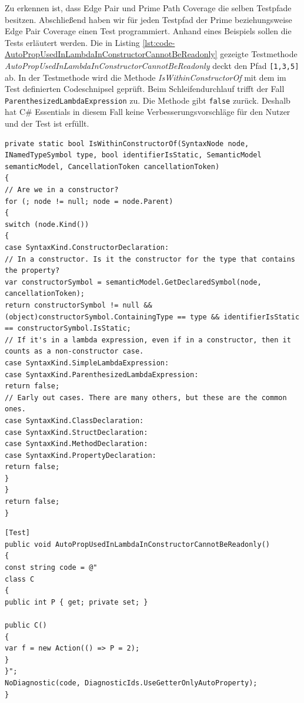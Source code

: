 \vspace{1ex}
Zu erkennen ist, dass Edge Pair und Prime Path Coverage die selben Testpfade besitzen. Abschließend haben wir für jeden Testpfad der Prime beziehungsweise Edge Pair Coverage einen Test programmiert. Anhand eines Beispiels sollen die Tests erläutert werden. Die in Listing \ref{lst:code-AutoPropUsedInLambdaInConstructorCannotBeReadonly} gezeigte Testmethode \textit{AutoPropUsedInLambdaInConstructorCannotBeReadonly} deckt den Pfad \texttt{[1,3,5]} ab. In der Testmethode wird die Methode \textit{IsWithinConstructorOf} mit dem im Test definierten Codeschnipsel geprüft. Beim Schleifendurchlauf trifft der Fall \texttt{ParenthesizedLambdaExpression} zu. Die Methode gibt \texttt{false} zurück. Deshalb hat C\# Essentials in diesem Fall keine Verbesserungsvorschläge für den Nutzer und der Test ist erfüllt.
\begin{lstlisting}[caption={Mehtode \textit{IsWithinConstructorOf}},
label=lst:code-IsWithinConstructorOf]
private static bool IsWithinConstructorOf(SyntaxNode node, INamedTypeSymbol type, bool identifierIsStatic, SemanticModel semanticModel, CancellationToken cancellationToken)
{
// Are we in a constructor?
for (; node != null; node = node.Parent)
{
switch (node.Kind())
{
case SyntaxKind.ConstructorDeclaration:
// In a constructor. Is it the constructor for the type that contains the property?
var constructorSymbol = semanticModel.GetDeclaredSymbol(node, cancellationToken);
return constructorSymbol != null && (object)constructorSymbol.ContainingType == type && identifierIsStatic == constructorSymbol.IsStatic;
// If it's in a lambda expression, even if in a constructor, then it counts as a non-constructor case.
case SyntaxKind.SimpleLambdaExpression:
case SyntaxKind.ParenthesizedLambdaExpression:
return false;
// Early out cases. There are many others, but these are the common ones.
case SyntaxKind.ClassDeclaration:
case SyntaxKind.StructDeclaration:
case SyntaxKind.MethodDeclaration:
case SyntaxKind.PropertyDeclaration:
return false;
}
}
return false;
}
\end{lstlisting}
\begin{lstlisting}[caption={Mehtode \textit{AutoPropUsedInLambdaInConstructorCannotBeReadonly}},
label=lst:code-AutoPropUsedInLambdaInConstructorCannotBeReadonly]
[Test]
public void AutoPropUsedInLambdaInConstructorCannotBeReadonly()
{
const string code = @"
class C
{
public int P { get; private set; }

public C()
{
var f = new Action(() => P = 2);
}
}";
NoDiagnostic(code, DiagnosticIds.UseGetterOnlyAutoProperty);
}
\end{lstlisting}

